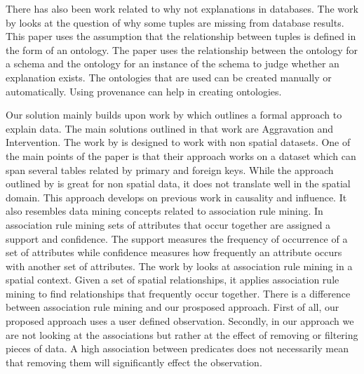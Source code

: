 There has also been work related to why not explanations in databases. The work by \citep{ten2015high} looks at the question of why some tuples are missing from database results. This paper uses the assumption that the relationship between tuples is defined in the form of an ontology. The paper uses the relationship between the ontology for a schema and the ontology for an instance of the schema to judge whether an explanation exists. The ontologies that are used can be created manually or automatically. Using provenance \citep{cheney2009provenance} can help in creating ontologies.

Our solution mainly builds upon work by \cite{roy2014formal} which outlines a formal approach to explain data. The main solutions outlined in that work are Aggravation and Intervention. The work by \cite{roy2014formal} is designed to work with non spatial datasets. One of the main points of the paper is that their approach works on a dataset which can span several tables related by primary and foreign keys. While the approach outlined by \cite{roy2014formal} is great for non spatial data, it does not translate well in the spatial domain. This approach develops on previous work in causality and influence. It also resembles data mining concepts related to association rule mining\citep{agarwal1994fast,tan2006introduction}. In association rule mining sets of attributes that occur together are assigned a support and confidence. The support measures the frequency of occurrence of a set of attributes while confidence measures how frequently an attribute occurs with another set of attributes. The work by \cite{koperski1995discovery} looks at association rule mining in a spatial context. Given a set of spatial relationships, it applies association rule mining to find relationships that frequently occur together. There is a difference between association rule mining and our prosposed approach. First of all, our proposed approach uses a user defined observation. Secondly, in our approach we are not looking at the associations but rather at the effect of removing or filtering pieces of data. A high association between predicates does not necessarily mean that removing them will significantly effect the observation.

